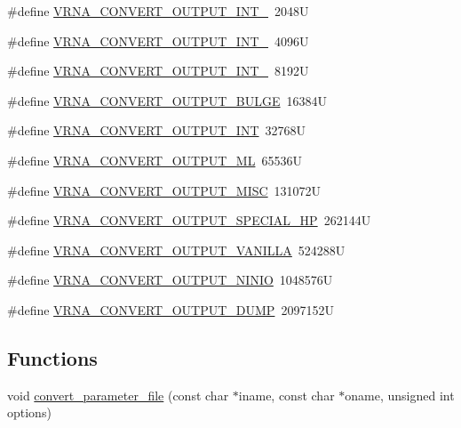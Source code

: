 \begin{DoxyCompactItemize}
\item 
\#define \hyperlink{group__energy__parameters__convert_ga079aafefd5f8ab57ee5120099a34bd25}{V\+R\+N\+A\+\_\+\+C\+O\+N\+V\+E\+R\+T\+\_\+\+O\+U\+T\+P\+U\+T\+\_\+\+I\+N\+T\+\_}~2048U
\item 
\#define \hyperlink{group__energy__parameters__convert_gacf770881d9034431ebe741642342a1f9}{V\+R\+N\+A\+\_\+\+C\+O\+N\+V\+E\+R\+T\+\_\+\+O\+U\+T\+P\+U\+T\+\_\+\+I\+N\+T\+\_}~4096U
\item 
\#define \hyperlink{group__energy__parameters__convert_gaa307671e2631cdacad9cbe4c6583b05f}{V\+R\+N\+A\+\_\+\+C\+O\+N\+V\+E\+R\+T\+\_\+\+O\+U\+T\+P\+U\+T\+\_\+\+I\+N\+T\+\_}~8192U
\item 
\#define \hyperlink{group__energy__parameters__convert_ga7092fe0be4de6f02cc0bf08e81af726a}{V\+R\+N\+A\+\_\+\+C\+O\+N\+V\+E\+R\+T\+\_\+\+O\+U\+T\+P\+U\+T\+\_\+\+B\+U\+L\+GE}~16384U
\item 
\#define \hyperlink{group__energy__parameters__convert_gac5c2289fdf8ff1b980976d1613ff943a}{V\+R\+N\+A\+\_\+\+C\+O\+N\+V\+E\+R\+T\+\_\+\+O\+U\+T\+P\+U\+T\+\_\+\+I\+NT}~32768U
\item 
\#define \hyperlink{group__energy__parameters__convert_gaf2c8755d64eff3852aa45df9ac80a4fe}{V\+R\+N\+A\+\_\+\+C\+O\+N\+V\+E\+R\+T\+\_\+\+O\+U\+T\+P\+U\+T\+\_\+\+ML}~65536U
\item 
\#define \hyperlink{group__energy__parameters__convert_ga46d5b1535ae86060b6317565b7c6b40b}{V\+R\+N\+A\+\_\+\+C\+O\+N\+V\+E\+R\+T\+\_\+\+O\+U\+T\+P\+U\+T\+\_\+\+M\+I\+SC}~131072U
\item 
\#define \hyperlink{group__energy__parameters__convert_gaa1ff48a79642d69579d1766561ec6db6}{V\+R\+N\+A\+\_\+\+C\+O\+N\+V\+E\+R\+T\+\_\+\+O\+U\+T\+P\+U\+T\+\_\+\+S\+P\+E\+C\+I\+A\+L\+\_\+\+HP}~262144U
\item 
\#define \hyperlink{group__energy__parameters__convert_ga0d4e8a836bb4864ab5129c085dbf592d}{V\+R\+N\+A\+\_\+\+C\+O\+N\+V\+E\+R\+T\+\_\+\+O\+U\+T\+P\+U\+T\+\_\+\+V\+A\+N\+I\+L\+LA}~524288U
\item 
\#define \hyperlink{group__energy__parameters__convert_ga2eb0462f16939ddacdaf751a88d675ce}{V\+R\+N\+A\+\_\+\+C\+O\+N\+V\+E\+R\+T\+\_\+\+O\+U\+T\+P\+U\+T\+\_\+\+N\+I\+N\+IO}~1048576U
\item 
\#define \hyperlink{group__energy__parameters__convert_gac86976e9c2a55b3a6481ea60044f6098}{V\+R\+N\+A\+\_\+\+C\+O\+N\+V\+E\+R\+T\+\_\+\+O\+U\+T\+P\+U\+T\+\_\+\+D\+U\+MP}~2097152U
\end{DoxyCompactItemize}
\subsection*{Functions}
\begin{DoxyCompactItemize}
\item 
void \hyperlink{group__energy__parameters__convert_gafbe538bc4eb2cf2a33326e1010005f8a}{convert\+\_\+parameter\+\_\+file} (const char $\ast$iname, const char $\ast$oname, unsigned int options)
\end{DoxyCompactItemize}


